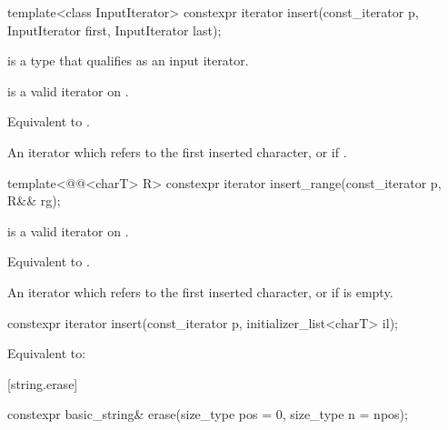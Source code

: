 %
\begin{itemdecl}
template<class InputIterator>
  constexpr iterator insert(const_iterator p, InputIterator first, InputIterator last);
\end{itemdecl}

\begin{itemdescr}
\pnum
\constraints
{} is a type that qualifies as an input
iterator.

\pnum
\expects
{} is a valid iterator on
.

\pnum
\effects
Equivalent to
.

\pnum
\returns
An iterator which refers to the first inserted character, or
 if .
\end{itemdescr}

%
\begin{itemdecl}
template<@@<charT> R>
  constexpr iterator insert_range(const_iterator p, R&& rg);
\end{itemdecl}

\begin{itemdescr}
\pnum
\expects
{} is a valid iterator on .

\pnum
\effects
Equivalent to
.

\pnum
\returns
An iterator which refers to the first inserted character, or
 if  is empty.
\end{itemdescr}

%
\begin{itemdecl}
constexpr iterator insert(const_iterator p, initializer_list<charT> il);
\end{itemdecl}

\begin{itemdescr}
\pnum
\effects
Equivalent to: 
\end{itemdescr}

[string.erase]{}

%
\begin{itemdecl}
constexpr basic_string& erase(size_type pos = 0, size_type n = npos);
\end{itemdecl}


